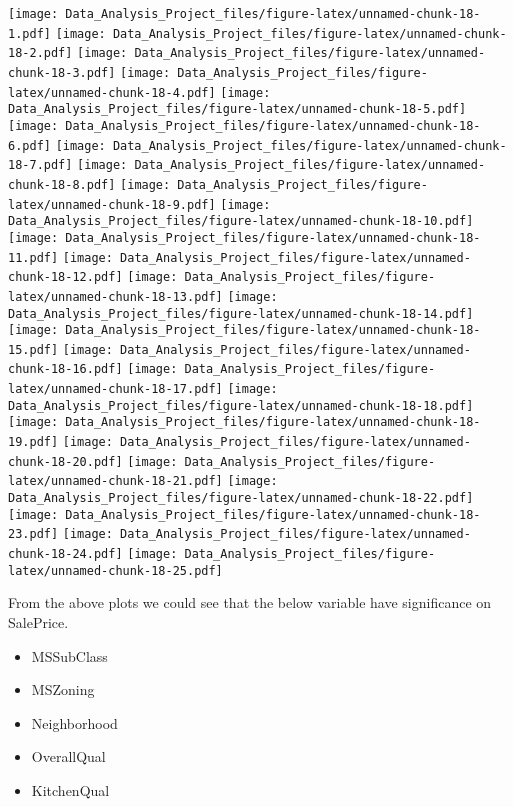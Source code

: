 \documentclass[]{article}
\providecommand{\tightlist}{%
  \setlength{\itemsep}{0pt}\setlength{\parskip}{0pt}}
\begin{document}
\texttt{[image: Data\_Analysis\_Project\_files/figure-latex/unnamed-chunk-18-1.pdf]}
\texttt{[image: Data\_Analysis\_Project\_files/figure-latex/unnamed-chunk-18-2.pdf]}
\texttt{[image: Data\_Analysis\_Project\_files/figure-latex/unnamed-chunk-18-3.pdf]}
\texttt{[image: Data\_Analysis\_Project\_files/figure-latex/unnamed-chunk-18-4.pdf]}
\texttt{[image: Data\_Analysis\_Project\_files/figure-latex/unnamed-chunk-18-5.pdf]}
\texttt{[image: Data\_Analysis\_Project\_files/figure-latex/unnamed-chunk-18-6.pdf]}
\texttt{[image: Data\_Analysis\_Project\_files/figure-latex/unnamed-chunk-18-7.pdf]}
\texttt{[image: Data\_Analysis\_Project\_files/figure-latex/unnamed-chunk-18-8.pdf]}
\texttt{[image: Data\_Analysis\_Project\_files/figure-latex/unnamed-chunk-18-9.pdf]}
\texttt{[image: Data\_Analysis\_Project\_files/figure-latex/unnamed-chunk-18-10.pdf]}
\texttt{[image: Data\_Analysis\_Project\_files/figure-latex/unnamed-chunk-18-11.pdf]}
\texttt{[image: Data\_Analysis\_Project\_files/figure-latex/unnamed-chunk-18-12.pdf]}
\texttt{[image: Data\_Analysis\_Project\_files/figure-latex/unnamed-chunk-18-13.pdf]}
\texttt{[image: Data\_Analysis\_Project\_files/figure-latex/unnamed-chunk-18-14.pdf]}
\texttt{[image: Data\_Analysis\_Project\_files/figure-latex/unnamed-chunk-18-15.pdf]}
\texttt{[image: Data\_Analysis\_Project\_files/figure-latex/unnamed-chunk-18-16.pdf]}
\texttt{[image: Data\_Analysis\_Project\_files/figure-latex/unnamed-chunk-18-17.pdf]}
\texttt{[image: Data\_Analysis\_Project\_files/figure-latex/unnamed-chunk-18-18.pdf]}
\texttt{[image: Data\_Analysis\_Project\_files/figure-latex/unnamed-chunk-18-19.pdf]}
\texttt{[image: Data\_Analysis\_Project\_files/figure-latex/unnamed-chunk-18-20.pdf]}
\texttt{[image: Data\_Analysis\_Project\_files/figure-latex/unnamed-chunk-18-21.pdf]}
\texttt{[image: Data\_Analysis\_Project\_files/figure-latex/unnamed-chunk-18-22.pdf]}
\texttt{[image: Data\_Analysis\_Project\_files/figure-latex/unnamed-chunk-18-23.pdf]}
\texttt{[image: Data\_Analysis\_Project\_files/figure-latex/unnamed-chunk-18-24.pdf]}
\texttt{[image: Data\_Analysis\_Project\_files/figure-latex/unnamed-chunk-18-25.pdf]}

From the above plots we could see that the below variable have
significance on SalePrice.

\begin{itemize}
\tightlist
\item
  MSSubClass
\item
  MSZoning
\item
  Neighborhood
\item
  OverallQual
\item
  KitchenQual
\end{itemize}
\end{document}
